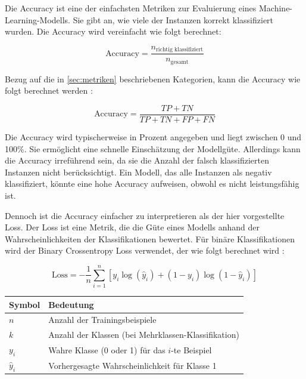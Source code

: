 Die Accuracy ist eine der einfachsten Metriken zur Evaluierung eines Machine-Learning-Modells. Sie gibt an, wie viele der Instanzen korrekt klassifiziert wurden. Die Accuracy wird vereinfacht wie folgt berechnet:

\begin{equation}
    \text{Accuracy} = \frac{n_{\text{richtig klassifiziert}}}{n_{\text{gesamt}}}
\end{equation}

Bezug auf die in \autoref{sec:metriken} beschriebenen Kategorien, kann die Accuracy wie folgt berechnet werden \cite{ai_wiki_accuracy_2019}:

\begin{equation}
    \text{Accuracy} = \frac{TP + TN}{TP + TN + FP + FN} 
\end{equation}

Die Accuracy wird typischerweise in Prozent angegeben und liegt zwischen 0 und 100\%. Sie ermöglicht eine schnelle Einschätzung der Modellgüte. Allerdings kann die Accuracy irreführend sein, da sie die Anzahl der falsch klassifizierten Instanzen nicht berücksichtigt. Ein Modell, das alle Instanzen als negativ klassifiziert, könnte eine hohe Accuracy aufweisen, obwohl es nicht leistungsfähig ist.

Dennoch ist die Accuracy einfacher zu interpretieren als der hier vorgestellte Loss. Der Loss ist eine Metrik, die die Güte eines Modells anhand der Wahrscheinlichkeiten der Klassifikationen bewertet. 
Für binäre Klassifikationen wird der Binary Crossentropy Loss verwendet, der wie folgt berechnet wird 
\cite{ai_wiki_accuracy_2019}:

\begin{equation}
    \text{Loss} = -\frac{1}{n} \sum_{i=1}^{n} \left[ y_i \log(\hat{y}_i) + (1 - y_i) \log(1 - \hat{y}_i) \right]
    \label{eq:binary_crossentropy}
\end{equation}

\begin{tabular}{ll}
    \hline
    \textbf{Symbol} & \textbf{Bedeutung} \\
    \hline
    $n$ & Anzahl der Trainingsbeispiele \\
    $k$ & Anzahl der Klassen (bei Mehrklassen-Klassifikation) \\
    $y_i$ & Wahre Klasse (0 oder 1) für das $i$-te Beispiel \\
    $\hat{y}_i$ & Vorhergesagte Wahrscheinlichkeit für Klasse 1 \\
    \hline
\end{tabular}

